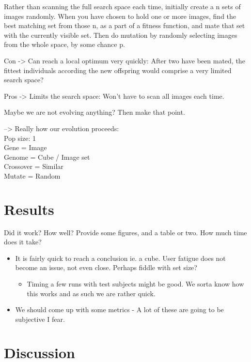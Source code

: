\documentclass[]{article}
\begin{document}
Rather than scanning the full search space each time, initially create a n sets of images randomly.  When you have chosen to hold one or more images, find the best matching set from those n, as a part of a fitness function, and mate that set with the currently visible set.  Then do mutation by randomly selecting images from the whole space, by some chance p.


Con ->  Can reach a local optimum very quickly:  After two have been mated, the fittest individuals according the new offspring would comprise a very limited search space?

Pros ->  Limits the search space:  Won’t have to scan all images each time.

Maybe we are not evolving anything?  Then make that point.

--> Really how our evolution proceeds:\\
Pop size: 1\\
Gene = Image\\
Genome = Cube / Image set\\
Crossover = Similar\\
Mutate = Random

\section{Results}
\label{sec:Results}
\begin{framed}
Did it work? How well? Provide some figures, and a table or two. How much time does it take?
\end{framed}
\begin{itemize}
\item It is fairly quick to reach a conclusion ie. a cube. User fatigue does not become an issue, not even close. Perhaps fiddle with set size?
	\begin{itemize}
	\item Timing a few runs with test subjects might be good. We sorta know how this works and as such we are rather quick.
	\end{itemize}
\item We should come up with some metrics - A lot of these are going to be subjective I fear.
\end{itemize}
\section{Discussion}
\label{sec:Discussion}
\end{document}
